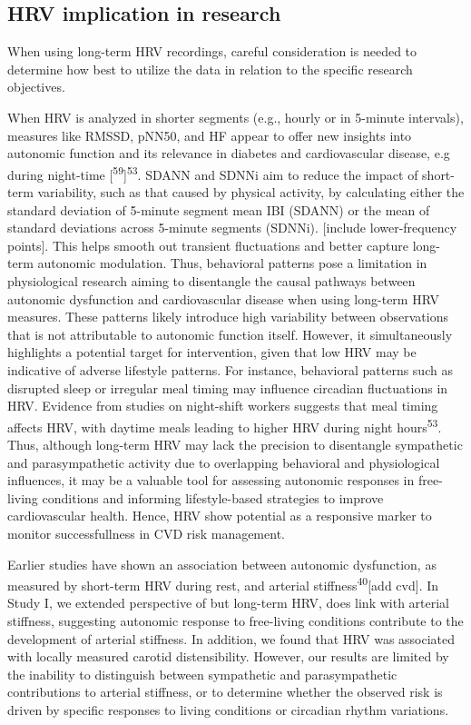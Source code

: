\documentclass[
  a4paper,
  headsepline=true,
  open=any]{scrbook}
\begin{document}
\hypertarget{hrv-implication-in-research}{%
\subsection{HRV implication in
research}\label{hrv-implication-in-research}}

When using long-term HRV recordings, careful consideration is needed to
determine how best to utilize the data in relation to the specific
research objectives.

When HRV is analyzed in shorter segments (e.g., hourly or in 5-minute
intervals), measures like RMSSD, pNN50, and HF appear to offer new
insights into autonomic function and its relevance in diabetes and
cardiovascular disease, e.g during night-time
{[}\textsuperscript{59}{]}\textsuperscript{53}. SDANN and SDNNi aim to
reduce the impact of short-term variability, such as that caused by
physical activity, by calculating either the standard deviation of
5-minute segment mean IBI (SDANN) or the mean of standard deviations
across 5-minute segments (SDNNi). {[}include lower-frequency points{]}.
This helps smooth out transient fluctuations and better capture
long-term autonomic modulation. Thus, behavioral patterns pose a
limitation in physiological research aiming to disentangle the causal
pathways between autonomic dysfunction and cardiovascular disease when
using long-term HRV measures. These patterns likely introduce high
variability between observations that is not attributable to autonomic
function itself. However, it simultaneously highlights a potential
target for intervention, given that low HRV may be indicative of adverse
lifestyle patterns. For instance, behavioral patterns such as disrupted
sleep or irregular meal timing may influence circadian fluctuations in
HRV. Evidence from studies on night-shift workers suggests that meal
timing affects HRV, with daytime meals leading to higher HRV during
night hours\textsuperscript{53}. Thus, although long-term HRV may lack
the precision to disentangle sympathetic and parasympathetic activity
due to overlapping behavioral and physiological influences, it may be a
valuable tool for assessing autonomic responses in free-living
conditions and informing lifestyle-based strategies to improve
cardiovascular health. Hence, HRV show potential as a responsive marker
to monitor successfullness in CVD risk management.

Earlier studies have shown an association between autonomic dysfunction,
as measured by short-term HRV during rest, and arterial
stiffness\textsuperscript{40}{[}add cvd{]}. In Study I, we extended
perspective of but long-term HRV, does link with arterial stiffness,
suggesting autonomic response to free-living conditions contribute to
the development of arterial stiffness. In addition, we found that HRV
was associated with locally measured carotid distensibility. However,
our results are limited by the inability to distinguish between
sympathetic and parasympathetic contributions to arterial stiffness, or
to determine whether the observed risk is driven by specific responses
to living conditions or circadian rhythm variations.
\end{document}
